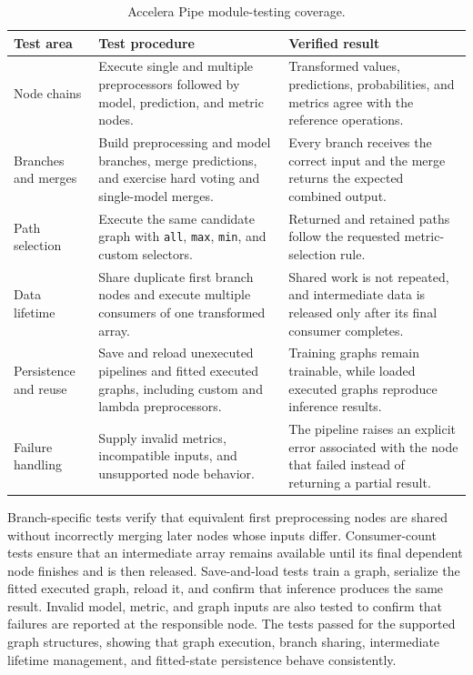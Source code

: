 \documentclass[12pt,a4paper]{report}
\newcommand{\acceleraTableStyle}{%
\small
\renewcommand{\arraystretch}{1.15}
\setlength{\tabcolsep}{4pt}%
}
\begin{document}
\begin{table}[H]
\centering
\acceleraTableStyle
\caption{Accelera Pipe module-testing coverage.}
\label{tab:accelera-pipe-module-tests}
\begin{tabularx}{\textwidth}{>{\raggedright\arraybackslash}p{}
  >{\raggedright\arraybackslash}X >{\raggedright\arraybackslash}X}
\toprule
\textbf{Test area} & \textbf{Test procedure} & \textbf{Verified result} \\
\midrule
Node chains & Execute single and multiple preprocessors followed by model,
prediction, and metric nodes. & Transformed values, predictions, probabilities,
and metrics agree with the reference operations. \\
\midrule
Branches and merges & Build preprocessing and model branches, merge predictions,
and exercise hard voting and single-model merges. & Every branch receives the
correct input and the merge returns the expected combined output. \\
\midrule
Path selection & Execute the same candidate graph with \texttt{all},
\texttt{max}, \texttt{min}, and custom selectors. & Returned and retained paths
follow the requested metric-selection rule. \\
\midrule
Data lifetime & Share duplicate first branch nodes and execute multiple consumers
of one transformed array. & Shared work is not repeated, and intermediate data
is released only after its final consumer completes. \\
\midrule
Persistence and reuse & Save and reload unexecuted pipelines and fitted executed
graphs, including custom and lambda preprocessors. & Training graphs remain
trainable, while loaded executed graphs reproduce inference results. \\
\midrule
Failure handling & Supply invalid metrics, incompatible inputs, and unsupported
node behavior. & The pipeline raises an explicit error associated with the node
that failed instead of returning a partial result. \\
\bottomrule
\end{tabularx}
\end{table}

\noindent Branch-specific tests verify that equivalent first preprocessing
nodes are shared without incorrectly merging later nodes whose inputs differ.
Consumer-count tests ensure that an intermediate array remains available until
its final dependent node finishes and is then released. Save-and-load tests
train a graph, serialize the fitted executed graph, reload it, and confirm that
inference produces the same result. Invalid model, metric, and graph inputs are
also tested to confirm that failures are reported at the responsible node. The
tests passed for the supported graph structures, showing that graph execution,
branch sharing, intermediate lifetime management, and fitted-state persistence
behave consistently.
\end{document}
